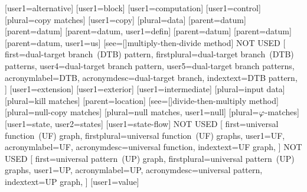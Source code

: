[user1={alternative}]
[user1={block}]
[user1={computation}]
[user1={control}]
[plural={copy matches}]
[user1={copy}]
[plural={data}]
[parent={datum}]
[parent={datum}]
[parent={datum}, user1={defin}]
[parent={datum}]
[parent={datum}]
[parent={datum}, user1={us}]
[see=[\seename]{multiply-then-divide method}]
%
           {NOT USED}%
           [%
             first={dual-target branch~(DTB) pattern},
             firstplural={dual-target branch~(DTB) patterns},
             user4={dual-target branch pattern},
             user5={dual-target branch patterns},
             acronymlabel={DTB},
             acronymdesc={dual-target branch},
             indextext={DTB pattern},
           ]
[user1={extension}]
[user1={exterior}]
[user1={intermediate}]
[plural={input data}]
[plural={kill matches}]
[parent={location}]
[see=[\seename]{divide-then-multiply method}]
[plural={null-copy matches}]
[plural={null matches}, user1={null}]
[plural={{}$\varphi$-matches}]
[user1={state}, user2={states}]
[user1={state-flow}]
%
           {NOT USED}%
           [%
             first={universal function~(UF) graph},
             firstplural={universal function~(UF) graphs},
             user1={UF},
             acronymlabel={UF},
             acronymdesc={universal function},
             indextext={UF graph},
           ]
%
           {NOT USED}%
           [%
             first={universal pattern~(UP) graph},
             firstplural={universal pattern~(UP) graphs},
             user1={UP},
             acronymlabel={UP},
             acronymdesc={universal pattern},
             indextext={UP graph},
           ]
[user1={value}]


